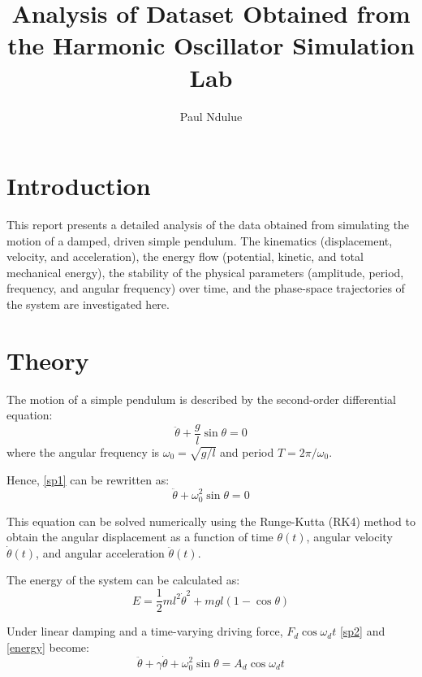 \documentclass[12pt]{article}
\title{Analysis of Dataset Obtained from the Harmonic Oscillator Simulation Lab}
\author{Paul Ndulue}
\date{}
\begin{document}
\maketitle

\section{Introduction}
This report presents a detailed analysis of the data obtained from simulating the motion of a damped, driven simple pendulum. The kinematics (displacement, velocity, and acceleration), the energy flow (potential, kinetic, and total mechanical energy), the stability of the physical parameters (amplitude, period, frequency, and angular frequency) over time, and the phase-space trajectories of the system are investigated here.

\section{Theory}
The motion of a simple pendulum is described by the second-order differential equation:
\begin{equation}
    \ddot{\theta} + \frac{g}{l} \sin{\theta} = 0
    \label{sp1}
\end{equation}
where the angular frequency is $\omega_0=\sqrt{g/l}$ and period $T=2\pi/\omega_0$.

Hence, \cref{sp1} can be rewritten as:
\begin{equation}
    \ddot{\theta} + \omega_0^2 \sin{\theta} = 0
    \label{sp2}
\end{equation}

This equation can be solved numerically using the Runge-Kutta (RK4) method to obtain the angular displacement as a function of time $\theta(t)$, angular velocity $\dot{\theta}(t)$, and angular acceleration $\ddot{\theta}(t)$.

The energy of the system can be calculated as:
\begin{equation}
    E = \frac{1}{2} m l^2 \dot{\theta}^2 + m g l (1 - \cos{\theta})
    \label{energy}
\end{equation}

Under linear damping and a time-varying driving force, $F_d \cos{\omega_d t}$ \cref{sp2} and \cref{energy} become:
\begin{equation}
    \ddot{\theta} + \gamma \dot{\theta} + \omega_0^2 \sin{\theta} = A_d \cos{\omega_d t}
    \label{sp3}
\end{equation}
\end{document}
